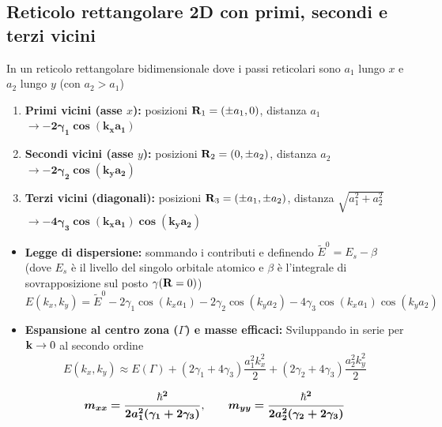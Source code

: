 \subsection{Reticolo rettangolare 2D con primi, secondi e terzi vicini}
In un reticolo rettangolare bidimensionale dove i passi reticolari sono $a_1$ lungo $x$ e $a_2$ lungo $y$ (con $a_2 > a_1$) 
\begin{enumerate}
    \item \textbf{Primi vicini (asse $x$):} posizioni $\mathbf{R}_1 = (\pm a_1, 0)$, distanza $a_1$ $ \rightarrow \bm{-2\gamma_1\cos(k_x a_1)} $ 
    \item \textbf{Secondi vicini (asse $y$):} posizioni $\mathbf{R}_2 = (0, \pm a_2)$, distanza $a_2$ $  \rightarrow \bm{-2\gamma_2\cos(k_y a_2)} $  
    \item \textbf{Terzi vicini (diagonali):} posizioni $\mathbf{R}_3 = (\pm a_1, \pm a_2)$, distanza $\sqrt{a_1^2+a_2^2}$ $  \rightarrow \bm{-4\gamma_3\cos(k_x a_1)\cos(k_y a_2)} $ 
\end{enumerate}

\begin{itemize}
    \setlength{\itemsep}{1pt}
    \item \textbf{Legge di dispersione:} sommando i contributi e definendo $\tilde E^0 = E_s - \beta$ (dove $E_s$ è il livello del singolo orbitale atomico e $\beta$ è l'integrale di sovrapposizione sul posto $\gamma(\mathbf{R}=0)$) 
    \[ E(k_x,k_y) = \tilde E^0 - 2\gamma_1\cos(k_xa_1) - 2\gamma_2\cos(k_ya_2) - 4\gamma_3\cos(k_xa_1)\cos(k_ya_2) \] 
    
    \item \textbf{Espansione al centro zona ($\Gamma$) e masse efficaci:} 
    Sviluppando in serie per $\mathbf{k} \to 0$ al secondo ordine 
    \[ E(k_x,k_y) \approx E(\Gamma) + (2\gamma_1+4\gamma_3)\frac{a_1^2k_x^2}{2} + (2\gamma_2+4\gamma_3)\frac{a_2^2k_y^2}{2} \] 

    \[ \bm{m_{xx} = \frac{\hbar^2}{2a_1^2(\gamma_1+2\gamma_3)}}, \qquad \bm{m_{yy} = \frac{\hbar^2}{2a_2^2(\gamma_2+2\gamma_3)}} \] 
\end{itemize}


